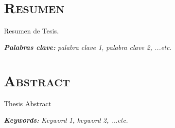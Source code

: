 
\cleardoublepage
\thispagestyle{plain}
{}
\chapter*{\normalfont\scshape{Resumen}}

\begin{center}
    \vspace*{\fill}

    \begin{minipage}{0.7\textwidth}
        Resumen de Tesis.

        \vspace{10pt}

        {\itshape\textbf{Palabras clave:}} \emph{palabra clave 1, palabra clave 2, ...etc.}
    \end{minipage}

    \vspace*{\fill}

\end{center}



\cleardoublepage
\thispagestyle{plain}
{}
\chapter*{\normalfont\scshape{Abstract}}

\begin{center}
    \vspace*{\fill}

    \begin{minipage}{0.7\textwidth}
        Thesis Abstract

        \vspace{10pt}

        \emph{\textbf{Keywords:}} \emph{Keyword 1, keyword 2, ...etc.}
    \end{minipage}

    \vspace*{\fill}

\end{center}
